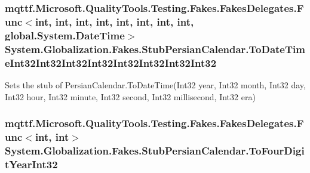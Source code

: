\hypertarget{class_system_1_1_globalization_1_1_fakes_1_1_stub_persian_calendar_a6cac99f788a742614c5896361c775e58}{
\subsubsection[{To\-Date\-Time\-Int32\-Int32\-Int32\-Int32\-Int32\-Int32\-Int32\-Int32}]{\setlength{\rightskip}{0pt plus 5cm}mqttf.\-Microsoft.\-Quality\-Tools.\-Testing.\-Fakes.\-Fakes\-Delegates.\-Func$<$int, int, int, int, int, int, int, int, global.\-System.\-Date\-Time$>$ System.\-Globalization.\-Fakes.\-Stub\-Persian\-Calendar.\-To\-Date\-Time\-Int32\-Int32\-Int32\-Int32\-Int32\-Int32\-Int32\-Int32}}\label{class_system_1_1_globalization_1_1_fakes_1_1_stub_persian_calendar_a6cac99f788a742614c5896361c775e58}


Sets the stub of Persian\-Calendar.\-To\-Date\-Time(\-Int32 year, Int32 month, Int32 day, Int32 hour, Int32 minute, Int32 second, Int32 millisecond, Int32 era)

\hypertarget{class_system_1_1_globalization_1_1_fakes_1_1_stub_persian_calendar_aa33e394768879c97dc47cd437a030a28}{
\subsubsection[{To\-Four\-Digit\-Year\-Int32}]{\setlength{\rightskip}{0pt plus 5cm}mqttf.\-Microsoft.\-Quality\-Tools.\-Testing.\-Fakes.\-Fakes\-Delegates.\-Func$<$int, int$>$ System.\-Globalization.\-Fakes.\-Stub\-Persian\-Calendar.\-To\-Four\-Digit\-Year\-Int32}}\label{class_system_1_1_globalization_1_1_fakes_1_1_stub_persian_calendar_aa33e394768879c97dc47cd437a030a28}


